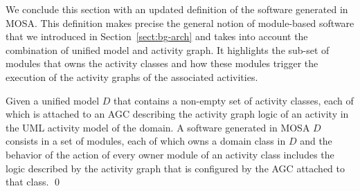 We conclude this section with an updated definition of the software generated in MOSA. This definition makes precise the general notion of module-based software that we introduced in Section~\ref{sect:bg-arch} and takes into account the combination of unified model and activity graph. It highlights the sub-set of modules that owns the activity classes and how these modules trigger the execution of the activity graphs of the associated activities.
%
\begin{definition} \label{def:software}
Given a unified model $D$ that contains a non-empty set of activity classes, each of which is attached to an AGC describing the activity graph logic of an activity in the UML activity model of the domain. A software generated in MOSA \wrt $D$ consists in a set of modules, each of which owns a domain class in $D$ and the behavior of the  action of every owner module of an activity class includes the logic described by the activity graph that is configured by the AGC attached to that class. \qed
\end{definition}



